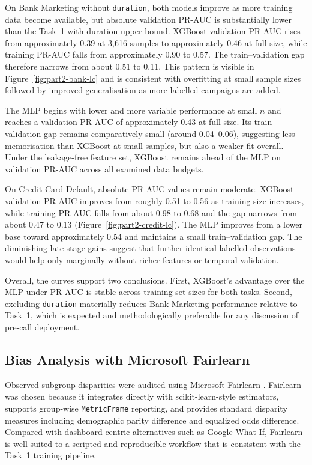 \documentclass[11pt,a4paper]{article}
\begin{document}
On Bank Marketing without \texttt{duration}, both models improve as more training data
become available, but absolute validation PR-AUC is substantially lower than the
Task~1 with-duration upper bound. XGBoost validation PR-AUC rises from approximately
0.39 at 3{,}616 samples to approximately 0.46 at full size, while training PR-AUC
falls from approximately 0.90 to 0.57. The train--validation gap therefore narrows from
about 0.51 to 0.11. This pattern is visible in Figure~\ref{fig:part2-bank-lc} and is
consistent with overfitting at small sample sizes followed by improved generalisation
as more labelled campaigns are added.

The MLP begins with lower and more variable performance at small $n$ and reaches a
validation PR-AUC of approximately 0.43 at full size. Its train--validation gap remains
comparatively small (around 0.04--0.06), suggesting less memorisation than XGBoost at
small samples, but also a weaker fit overall. Under the leakage-free feature set,
XGBoost remains ahead of the MLP on validation PR-AUC across all examined data budgets.

On Credit Card Default, absolute PR-AUC values remain moderate. XGBoost validation
PR-AUC improves from roughly 0.51 to 0.56 as training size increases, while training
PR-AUC falls from about 0.98 to 0.68 and the gap narrows from about 0.47 to 0.13
(Figure~\ref{fig:part2-credit-lc}). The MLP improves from a lower base toward
approximately 0.54 and maintains a small train--validation gap. The diminishing
late-stage gains suggest that further identical labelled observations would help only
marginally without richer features or temporal validation.

Overall, the curves support two conclusions. First, XGBoost's advantage over the MLP
under PR-AUC is stable across training-set sizes for both tasks. Second, excluding
\texttt{duration} materially reduces Bank Marketing performance relative to Task~1,
which is expected and methodologically preferable for any discussion of pre-call
deployment.


\subsection{Bias Analysis with Microsoft Fairlearn}
\label{sec:part2-fairness}

Observed subgroup disparities were audited using Microsoft Fairlearn
\cite{bird2020fairlearn}. Fairlearn was chosen because it integrates directly with
scikit-learn-style estimators, supports group-wise \texttt{MetricFrame} reporting, and
provides standard disparity measures including demographic parity difference and
equalized odds difference. Compared with dashboard-centric alternatives such as
Google What-If, Fairlearn is well suited to a scripted and reproducible workflow that
is consistent with the Task~1 training pipeline.
\end{document}
